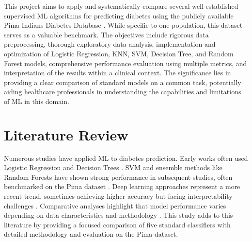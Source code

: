 \documentclass[conference]{IEEEtran}
\begin{document}
This project aims to apply and systematically compare several well-established supervised ML algorithms for predicting diabetes using the publicly available Pima Indians Diabetes Database \cite{pima_uci}. While specific to one population, this dataset serves as a valuable benchmark. The objectives include rigorous data preprocessing, thorough exploratory data analysis, implementation and optimization of Logistic Regression, KNN, SVM, Decision Tree, and Random Forest models, comprehensive performance evaluation using multiple metrics, and interpretation of the results within a clinical context. The significance lies in providing a clear comparison of standard models on a common task, potentially aiding healthcare professionals in understanding the capabilities and limitations of ML in this domain.

\section{Literature Review}
Numerous studies have applied ML to diabetes prediction. Early works often used Logistic Regression and Decision Trees \cite{early_study_example, dt_study}. SVM and ensemble methods like Random Forests have shown strong performance in subsequent studies, often benchmarked on the Pima dataset \cite{svm_study_1, rf_study_1}. Deep learning approaches represent a more recent trend, sometimes achieving higher accuracy but facing interpretability challenges \cite{johnson2019}. Comparative analyses highlight that model performance varies depending on data characteristics and methodology \cite{comparative_study_1}. This study adds to this literature by providing a focused comparison of five standard classifiers with detailed methodology and evaluation on the Pima dataset.

\end{document}
